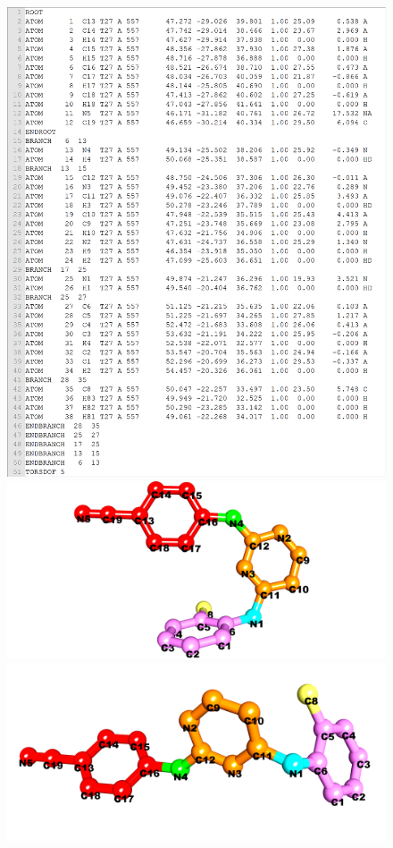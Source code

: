 \documentclass[twocolumn]{svjour3}          %
\begin{document}
\begin{figure}
\includegraphics[width=1.36\textwidth,natwidth=1899,natheight=2350]{../usrt/T27DockedPDBQT.png}
\endminipage
\\
\centering
\includegraphics[width=1.36\textwidth,natwidth=1904,natheight=894]{../usrt/T27Crystal.png}
\endminipage
{}
\centering
\includegraphics[width=1.36\textwidth,natwidth=1904,natheight=894]{../usrt/T27Docked.png}

\end{figure}
\end{document}

